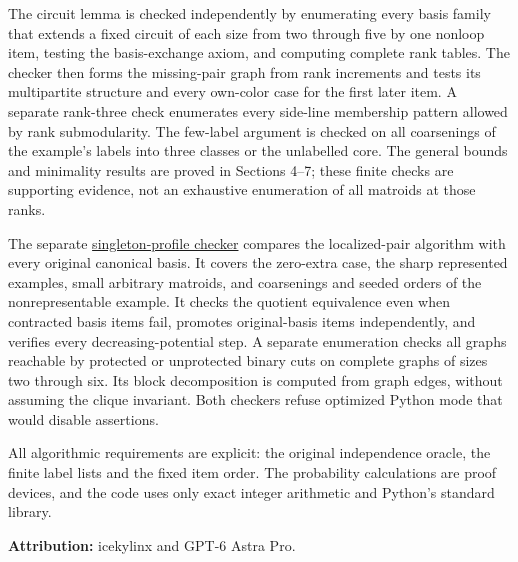 The circuit lemma is checked independently by enumerating every basis family that extends a fixed circuit of each size from two through five by one nonloop item, testing the basis-exchange axiom, and computing complete rank tables. The checker then forms the missing-pair graph from rank increments and tests its multipartite structure and every own-color case for the first later item. A separate rank-three check enumerates every side-line membership pattern allowed by rank submodularity. The few-label argument is checked on all coarsenings of the example's labels into three classes or the unlabelled core. The general bounds and minimality results are proved in Sections 4--7; these finite checks are supporting evidence, not an exhaustive enumeration of all matroids at those ranks.

The separate \href{https://github.com/icekylinx/algorithm-frontier/blob/main/problems/matroid-failure-summaries/verify/check_single_replacement.py}{singleton-profile checker} compares the localized-pair algorithm with every original canonical basis. It covers the zero-extra case, the sharp represented examples, small arbitrary matroids, and coarsenings and seeded orders of the nonrepresentable example. It checks the quotient equivalence even when contracted basis items fail, promotes original-basis items independently, and verifies every decreasing-potential step. A separate enumeration checks all graphs reachable by protected or unprotected binary cuts on complete graphs of sizes two through six. Its block decomposition is computed from graph edges, without assuming the clique invariant. Both checkers refuse optimized Python mode that would disable assertions.

All algorithmic requirements are explicit: the original independence oracle, the finite label lists and the fixed item order. The probability calculations are proof devices, and the code uses only exact integer arithmetic and Python's standard library.

\textbf{Attribution:} icekylinx and GPT-6 Astra Pro.
